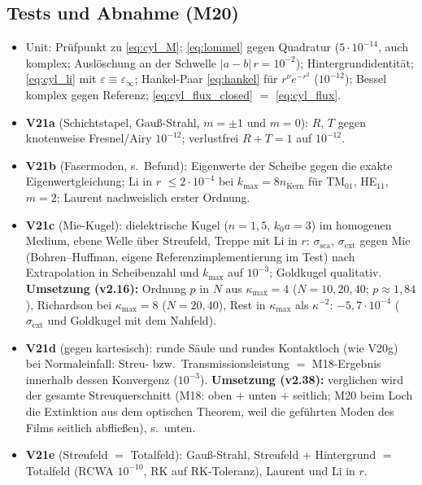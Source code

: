 \subsection{Tests und Abnahme (M20)}
\begin{itemize}[nosep]
  \item Unit: Prüfpunkt zu \eqref{eq:cyl_M}; \eqref{eq:lommel} gegen Quadratur ($5\cdot10^{-14}$, auch komplex; Auslöschung an der Schwelle $|a-b|\,r=10^{-2}$);
        Hintergrundidentität; \eqref{eq:cyl_li} mit $\varepsilon\equiv\varepsilon_\infty$; Hankel-Paar \eqref{eq:hankel} für
        $r^\nu e^{-r^2}$ ($10^{-12}$); Bessel komplex gegen Referenz; \eqref{eq:cyl_flux_closed} $=$ \eqref{eq:cyl_flux}.
  \item \textbf{V21a} (Schichtstapel, Gauß-Strahl, $m=\pm1$ und $m=0$): $R$, $T$ gegen knotenweise Fresnel/Airy $10^{-12}$;
        verlustfrei $R+T=1$ auf $10^{-12}$.
  \item \textbf{V21b} (Fasermoden, s.\ Befund): Eigenwerte der Scheibe gegen die exakte Eigenwertgleichung; Li in $r$
        $\le2\cdot10^{-4}$ bei $k_{\max}=8n_{\text{Kern}}$ für TM$_{01}$, HE$_{11}$, $m=2$; Laurent nachweislich erster Ordnung.
  \item \textbf{V21c} (Mie-Kugel): dielektrische Kugel ($n=1{,}5$, $k_0a=3$) im homogenen Medium, ebene Welle über
        Streufeld, Treppe mit Li in $r$: $\sigma_{\text{sca}}$, $\sigma_{\text{ext}}$ gegen Mie (Bohren--Huffman, eigene
        Referenzimplementierung im Test) nach Extrapolation in Scheibenzahl und $k_{\max}$ auf $10^{-3}$; Goldkugel qualitativ.
        \textbf{Umsetzung (v2.16):} Ordnung $p$ in $N$ aus $\kappa_{\max}=4$ ($N=10,20,40$; $p\approx1{,}84$), Richardson bei
        $\kappa_{\max}=8$ ($N=20,40$), Rest in $\kappa_{\max}$ als $\kappa^{-2}$: $-5{,}7\cdot10^{-4}$ ($\sigma_{\text{ext}}$ und
        Goldkugel mit dem Nahfeld).
  \item \textbf{V21d} (gegen kartesisch): runde Säule und rundes Kontaktloch (wie V20g) bei Normaleinfall: Streu- bzw.\
        Transmissionsleistung $=$ M18-Ergebnis innerhalb dessen Konvergenz ($10^{-3}$). \textbf{Umsetzung (v2.38):}
        verglichen wird der gesamte Streuquerschnitt (M18: oben $+$ unten $+$ seitlich; M20 beim Loch die Extinktion
        aus dem optischen Theorem, weil die geführten Moden des Films seitlich abfließen), s.\ unten.
  \item \textbf{V21e} (Streufeld $=$ Totalfeld): Gauß-Strahl, Streufeld $+$ Hintergrund $=$ Totalfeld (RCWA $10^{-10}$,
        RK auf RK-Toleranz), Laurent und Li in $r$.

\end{itemize}
